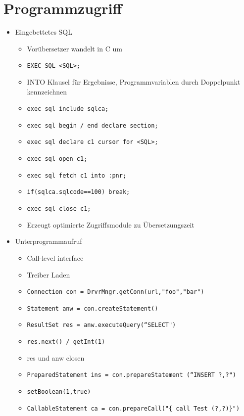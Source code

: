 \documentclass[11pt, paper=a4, twocolumn]{scrartcl}
\begin{document}
	\section{Programmzugriff}
		\begin{itemize}
			\item Eingebettetes SQL
				\begin{itemize}
					\item Vorübersetzer wandelt in C um
					\item \texttt{EXEC SQL <SQL>;}
					\item INTO Klausel für Ergebnisse, 
						Programmvariablen durch Doppelpunkt 
						kennzeichnen
					\item \texttt{exec sql include sqlca;}
					\item \texttt{exec sql begin / end declare 
						section;}
					\item \texttt{exec sql declare c1 cursor for 
						<SQL>;}
					\item \texttt{exec sql open c1;}
					\item \texttt{exec sql fetch c1 into :pnr;}
					\item \texttt{if(sqlca.sqlcode==100) break;}
					\item \texttt{exec sql close c1;}
					\item Erzeugt optimierte Zugriffsmodule zu 
						Übersetzungszeit

				\end{itemize}
			\item Unterprogrammaufruf
				\begin{itemize}
					\item Call-level interface
					\item Treiber Laden
					\item \texttt{Connection con = 
						DrvrMngr.getConn(url,"foo","bar")}
					\item \texttt{Statement anw = 
						con.createStatement()}
					\item \texttt{ResultSet res = 
						anw.executeQuery(``SELECT")}
					\item \texttt{res.next() / getInt(1)}
					\item res und anw closen
					\item \texttt{PreparedStatement ins = 
						con.prepareStatement (``INSERT ?,?")}
					\item \texttt{setBoolean(1,true)}
					\item \texttt{CallableStatement ca = 
						con.prepareCall("\{ call Test (?,?)\}")}
				\end{itemize}
		\end{itemize}
\end{document}
